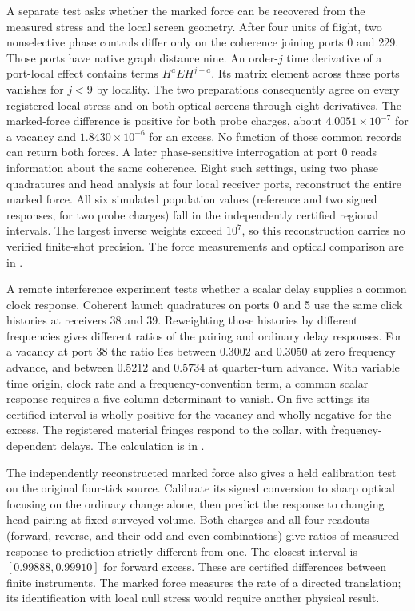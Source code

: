 \documentclass[11pt]{article}
\begin{document}
A separate test asks whether the marked force can be recovered from
the measured stress and the local screen geometry. After four units
of flight, two nonselective phase controls differ only on the
coherence joining ports 0 and 229. Those ports have native graph
distance nine. An order-$j$ time derivative of a port-local effect
contains terms $H^a E H^{j-a}$. Its matrix element across these ports
vanishes for $j<9$ by locality. The two preparations consequently agree
on every registered local stress and on both optical screens through
eight derivatives. The marked-force difference is positive for
both probe charges, about $4.0051\times10^{-7}$ for a vacancy and
$1.8430\times10^{-6}$ for an excess. No function of those common records
can return both forces. A later phase-sensitive interrogation at port 0
reads information about the same coherence. Eight such settings,
using two phase quadratures and head analysis at four local receiver
ports, reconstruct the entire marked force. All six simulated population
values (reference and two signed responses, for two probe charges)
fall in the independently certified regional intervals. The largest
inverse weights exceed $10^7$, so this reconstruction carries no
verified finite-shot precision. The force measurements
and optical comparison are in .

A remote interference experiment tests whether a scalar delay supplies
a common clock response. Coherent launch quadratures on ports 0 and 5
use the same click histories at receivers 38 and 39. Reweighting
those histories by different frequencies gives different ratios of
the pairing and ordinary delay responses. For a vacancy at port 38
the ratio lies between $0.3002$ and $0.3050$ at zero frequency advance,
and between $0.5212$ and $0.5734$ at quarter-turn advance.
With variable time origin, clock rate and a frequency-convention term,
a common scalar response requires a five-column determinant to vanish.
On five settings its certified interval is wholly positive for the
vacancy and wholly negative for the excess. The registered material
fringes respond to the collar, with frequency-dependent delays. The
calculation is in .

The independently reconstructed marked force also gives a held
calibration test on the original four-tick source. Calibrate its signed
conversion to sharp optical focusing on the ordinary change alone,
then predict the response to changing head pairing at fixed surveyed
volume. Both charges and all four readouts (forward, reverse, and
their odd and even combinations) give ratios of measured response to
prediction strictly different from one. The closest interval is
$[0.99888,0.99910]$ for forward excess. These are certified differences
between finite instruments. The marked force measures the rate of a
directed translation; its identification with local null stress would
require another physical result.
\end{document}
